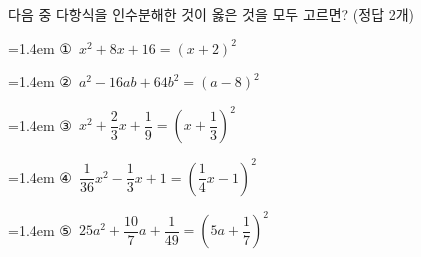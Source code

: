 다음 중 다항식을 인수분해한 것이 옳은 것을 모두 고르면? (정답 2개)
\par\medskip\par\noindent\hangindent=1.4em {\small ①}\ $x^2+8x+16=(x+2)^2$\par\noindent\hangindent=1.4em {\small ②}\ $a^2-16ab+64b^2=(a-8)^2$\par\noindent\hangindent=1.4em {\small ③}\ $x^2+\dfrac{2}{3}x+\dfrac{1}{9}=\left(x+\dfrac{1}{3}\right)^2$\par\noindent\hangindent=1.4em {\small ④}\ $\dfrac{1}{36}x^2-\dfrac{1}{3}x+1=\left(\dfrac{1}{4}x-1\right)^2$\par\noindent\hangindent=1.4em {\small ⑤}\ $25a^2+\dfrac{10}{7}a+\dfrac{1}{49}=\left(5a+\dfrac{1}{7}\right)^2$\par\medskip
